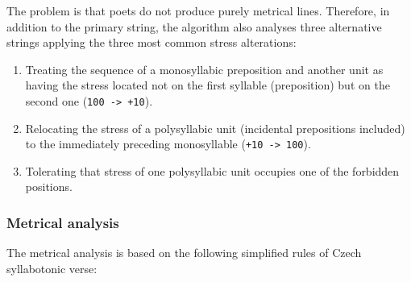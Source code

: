The problem is that poets do not produce purely metrical lines. Therefore, in addition to the primary string, the algorithm also analyses three alternative strings applying the three most common stress alterations:
\begin{enumerate}
    \item Treating the sequence of a monosyllabic preposition and another unit as having the stress located not on the first syllable (preposition) but on the second one (\verb|100 -> +10|).
    \item Relocating the stress of a polysyllabic unit (incidental prepositions included) to the immediately preceding monosyllable (\verb|+10 -> 100|).
    \item Tolerating that stress of one polysyllabic unit occupies one of the forbidden positions.
\end{enumerate}

\subsubsection{Metrical analysis}
The metrical analysis is based on the following simplified rules of Czech syllabotonic verse:

